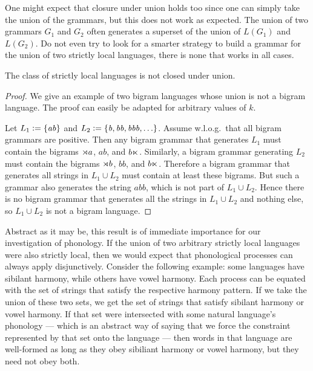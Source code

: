 One might expect that closure under union holds too since one can simply take the union of the grammars, but this does not work as expected.
The union of two grammars $G_1$ and $G_2$ often generates a superset of the union of $L(G_1)$ and $L(G_2)$.
Do not even try to look for a smarter strategy to build a grammar for the union of two strictly local languages, there is none that works in all cases.
%
\begin{lemma}
    The class of strictly local languages is not closed under union. 
\end{lemma}
%
\begin{proof}
    We give an example of two bigram languages whose union is not a bigram language.
    The proof can easily be adapted for arbitrary values of $k$.

    Let $L_1 \mathrel{\mathop:}= \left \{ \mathit{ab} \right \}$ and $L_2 \mathrel{\mathop:}= \left \{ \mathit{b}, \mathit{bb}, \mathit{bbb}, \ldots \right \}$.
    Assume w.l.o.g.\ that all bigram grammars are positive.
    Then any bigram grammar that generates $L_1$ must contain the bigrams $\rtimes a$, $\mathit{ab}$, and $b \ltimes$.
    Similarly, a bigram grammar generating $L_2$ must contain the bigrams $\rtimes b$, $\mathit{bb}$, and $b \ltimes$.
    Therefore a bigram grammar that generates all strings in $L_1 \cup L_2$ must contain at least these bigrams.
    But such a grammar also generates the string $\mathit{abb}$, which is not part of $L_1 \cup L_2$.
    Hence there is no bigram grammar that generates all the strings in $L_1 \cup L_2$ and nothing else, so $L_1 \cup L_2$ is not a bigram language.
\end{proof}
%
Abstract as it may be, this result is of immediate importance for our investigation of phonology.
If the union of two arbitrary strictly local languages were also strictly local, then we would expect that phonological processes can always apply disjunctively.
Consider the following example: some languages have sibilant harmony, while others have vowel harmony.
Each process can be equated with the set of strings that satisfy the respective harmony pattern.
If we take the union of these two sets, we get the set of strings that satisfy sibilant harmony or vowel harmony.
If that set were intersected with some natural language's phonology --- which is an abstract way of saying that we force the constraint represented by that set onto the language --- then words in that language are well-formed as long as they obey sibiliant harmony or vowel harmony, but they need not obey both.
